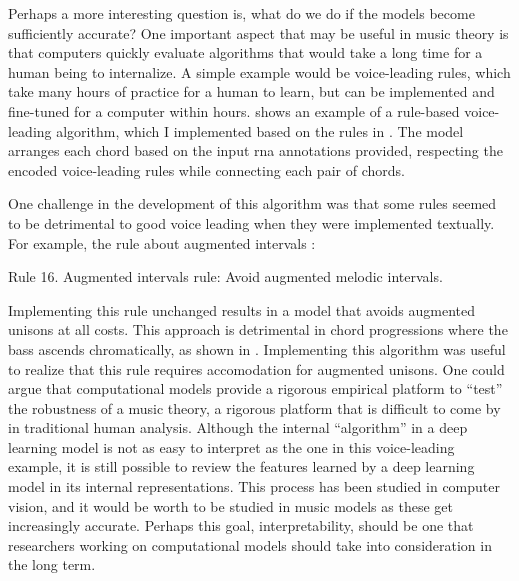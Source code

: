 

Perhaps a more interesting question is, what do we do if the
models become sufficiently accurate? One important aspect
that may be useful in music theory is that computers quickly
evaluate algorithms that would take a long time for a human
being to internalize. A simple example would be
voice-leading rules, which take many hours of practice for a
human to learn, but can be implemented and fine-tuned for a
computer within hours. 
shows an example of a rule-based voice-leading algorithm,
which I implemented based on the rules in
\textcite[p.~10]{huron2016voice}.
The model arranges each chord based on the input \gls{rna}
annotations provided, respecting the encoded voice-leading
rules while connecting each pair of chords. 


One challenge in the development of this algorithm was that
some rules seemed to be detrimental to good voice leading
when they were implemented textually. For example, the rule
about augmented intervals \parencite[p.~12]{huron2016voice}:

\begin{italicsquote}
    Rule 16. Augmented intervals rule: Avoid augmented
    melodic intervals.
\end{italicsquote}

Implementing this rule unchanged results in a model that
avoids augmented unisons at all costs. This approach is
detrimental in chord progressions where the bass ascends
chromatically, as shown in
. Implementing this
algorithm was useful to realize that this rule requires
accomodation for augmented unisons. One could argue that
computational models provide a rigorous empirical platform
to ``test'' the robustness of a music theory, a rigorous
platform that is difficult to come by in traditional human
analysis. Although the internal ``algorithm'' in a deep
learning model is not as easy to interpret as the one in
this voice-leading example, it is still possible to review
the features learned by a deep learning model in its
internal representations. This process has been studied in
computer vision, and it would be worth to be studied in
music models as these get increasingly accurate. Perhaps
this goal, interpretability, should be one that researchers
working on computational models should take into
consideration in the long term.
